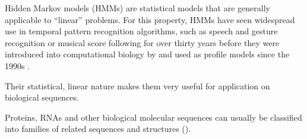 \label{sec:hmms}
Hidden Markov models (HMMs) are statistical models that are generally applicable
to ``linear'' problems. For this property, HMMs have seen widespread use in
temporal pattern recognition algorithms, such as speech and gesture recognition
or musical score following for over thirty years before they were introduced
into computational biology by \citet{churchill1989} and used as profile models
since the 1990s \citep{krogh1994}.

Their statistical, linear nature makes them very useful for application on
biological sequences.



Proteins, RNAs and other biological molecular sequences can usually be
classified into families of related sequences and structures
(\cite{henikoff1997}).

%

